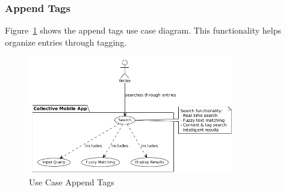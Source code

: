\subsubsection{Append Tags}

Figure~\ref{fig:usecase-append-tags} shows the append tags use case diagram. This functionality helps organize entries through tagging.

\begin{figure}[H]
\centering
\includegraphics[width=0.8\textwidth]{files/imgs/usecase_U9ojKh5kmZ.png}
\caption{Use Case Append Tags}
\label{fig:usecase-append-tags}
\end{figure}

